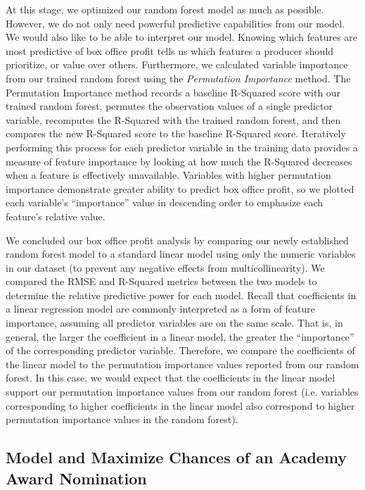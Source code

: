 \documentclass[10pt]{article}
\begin{document}
At this stage, we optimized our random forest model as much as possible. However, we do not only need powerful predictive capabilities from our model. We would also like to be able to interpret our model. Knowing which features are most predictive of box office profit tells us which features a producer should prioritize, or value over others. Furthermore, we calculated variable importance from our trained random forest using the \textit{Permutation Importance} method. The Permutation Importance method records a baseline R-Squared score with our trained random forest, permutes the observation values of a single predictor variable, recomputes the R-Squared with the trained random forest, and then compares the new R-Squared score to the baseline R-Squared score. Iteratively performing this process for each predictor variable in the training data provides a measure of feature importance by looking at how much the R-Squared decreases when a feature is effectively unavailable. Variables with higher permutation importance demonstrate greater ability to predict box office profit, so we plotted each variable’s “importance” value in descending order to emphasize each feature’s relative value.

We concluded our box office profit analysis by comparing our newly established random forest model to a standard linear model using only the numeric variables in our dataset (to prevent any negative effects from multicollinearity). We compared the RMSE and R-Squared metrics between the two models to determine the relative predictive power for each model. Recall that coefficients in a linear regression model are commonly interpreted as a form of feature importance, assuming all predictor variables are on the same scale. That is, in general, the larger the coefficient in a linear model, the greater the “importance” of the corresponding predictor variable. Therefore, we compare the coefficients of the linear model to the permutation importance values reported from our random forest. In this case, we would expect that the coefficients in the linear model support our permutation importance values from our random forest (i.e. variables corresponding to higher coefficients in the linear model also correspond to higher permutation importance values in the random forest).

\subsection{Model and Maximize Chances of an Academy Award Nomination}
\end{document}
